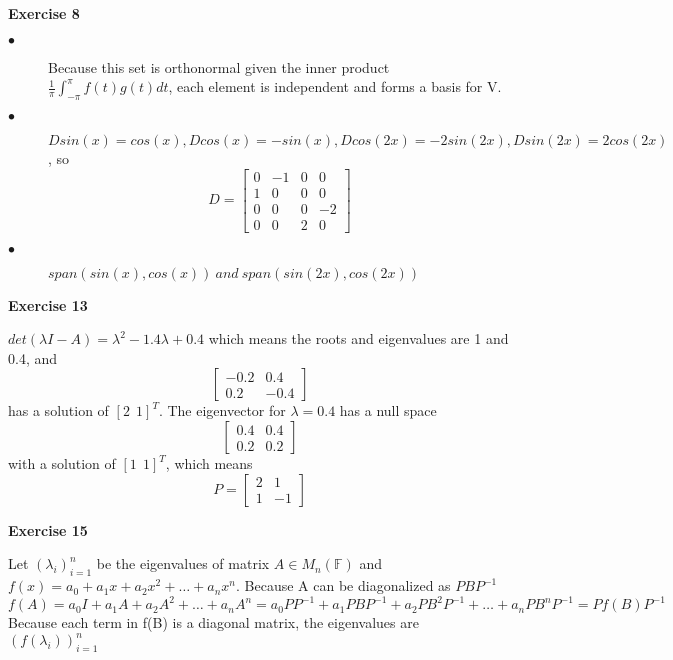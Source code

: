 \documentclass[letterpaper,12pt]{article}
\theoremstyle{definition}
\begin{document}
\vspace{3mm}
\noindent\textbf{Exercise 8}
\begin{description}
\item[$\bullet$] Because this set is orthonormal given the inner product $\frac{1}{\pi}\int_{-\pi}^{\pi} f(t)g(t)dt$, each element is independent and forms a basis for V. 
\item[$\bullet$] $Dsin(x) = cos(x), Dcos(x) = -sin(x), Dcos(2x) = -2sin(2x), Dsin(2x) = 2cos(2x)$, so 
 \[ D =
  \begin{bmatrix}
   0 & -1 & 0 & 0 \\
   1 & 0 & 0 & 0 \\
   0 & 0 & 0 & -2 \\
   0 & 0 & 2 & 0 
\end{bmatrix}
\]
\item[$\bullet$] $span({sin(x), cos(x)}) \ and \ span({sin(2x), cos(2x)})$
\end{description}

\vspace{3mm}
\noindent\textbf{Exercise 13}
\begin{description}
  \item $det(\lambda I -A) = \lambda^2 -1.4\lambda + 0.4$ which means the roots and eigenvalues are 1 and 0.4, and 
   \[
  \begin{bmatrix}
   -0.2 & 0.4 \\
   0.2 & -0.4
\end{bmatrix}
\]
has a solution of $[2 \ \ 1]^T$.
The eigenvector for $\lambda = 0.4$ has a null space 
 \[
  \begin{bmatrix}
   0.4 & 0.4 \\
   0.2 & 0.2
\end{bmatrix}
\]
with a solution of $[1 \ \  1]^T$, which means
 \[P =
  \begin{bmatrix}
   2 & 1 \\
   1 & -1
\end{bmatrix}
\]
\end{description}

\vspace{3mm}
\noindent\textbf{Exercise 15}
\begin{description}
  \item Let $(\lambda_i)_{i=1}^n$ be the eigenvalues of matrix $A \in M_n(\mathbb{F})$ and $f(x) = a_0 + a_1x + a_2x^2 + \dots + a_nx^n$. Because A can be diagonalized as $PBP^{-1}$
  \[f(A) = a_0I + a_1A + a_2A^2 + \dots + a_nA^n = a_0PP^{-1} + a_1PBP^{-1} + a_2PB^2P^{-1} + \dots + a_nPB^nP^{-1} = Pf(B)P^{-1}\]
  Because each term in f(B) is a diagonal matrix, the eigenvalues are $(f(\lambda_i))_{i=1}^n$
\end{description}
\end{document}
